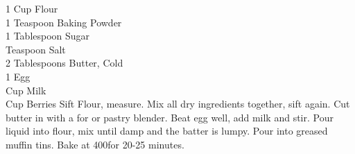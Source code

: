 {1 Cup Flour \\
 1 Teaspoon Baking Powder \\
 1 Tablespoon Sugar \\
  Teaspoon Salt \\
 2 Tablespoons Butter, Cold \\
 1 Egg \\
  Cup Milk \\
  Cup Berries}
{Sift Flour, measure. Mix all dry ingredients together, sift again. Cut butter in with a for or pastry blender. Beat egg well, add milk and stir. Pour liquid into flour, mix until damp and the batter is lumpy. Pour into greased muffin tins. Bake at 400\degree for 20-25 minutes.}
